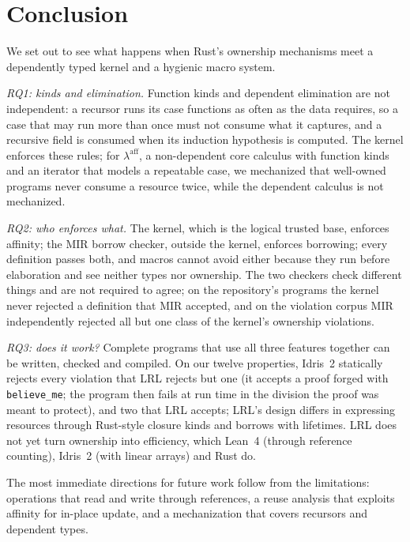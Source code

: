 \section{Conclusion}\label{sec:conclusion}

We set out to see what happens when Rust's ownership mechanisms meet a dependently typed kernel and a hygienic macro system.

\emph{RQ1: kinds and elimination.}
Function kinds and dependent elimination are not independent: a recursor runs its case functions as often as the data requires, so a case that may run more than once must not consume what it captures, and a recursive field is consumed when its induction hypothesis is computed.
The kernel enforces these rules; for $\lambda^{\mathrm{aff}}$, a non-dependent core calculus with function kinds and an iterator that models a repeatable case, we mechanized that well-owned programs never consume a resource twice, while the dependent calculus is not mechanized.

\emph{RQ2: who enforces what.}
The kernel, which is the logical trusted base, enforces affinity; the MIR borrow checker, outside the kernel, enforces borrowing; every definition passes both, and macros cannot avoid either because they run before elaboration and see neither types nor ownership.
The two checkers check different things and are not required to agree; on the repository's programs the kernel never rejected a definition that MIR accepted, and on the violation corpus MIR independently rejected all but one class of the kernel's ownership violations.

\emph{RQ3: does it work?}
Complete programs that use all three features together can be written, checked and compiled.
On our twelve properties, Idris~2 statically rejects every violation that LRL rejects but one (it accepts a proof forged with \lstinline|believe_me|; the program then fails at run time in the division the proof was meant to protect), and two that LRL accepts; LRL's design differs in expressing resources through Rust-style closure kinds and borrows with lifetimes.
LRL does not yet turn ownership into efficiency, which Lean~4 (through reference counting), Idris~2 (with linear arrays) and Rust do.

The most immediate directions for future work follow from the limitations: operations that read and write through references, a reuse analysis that exploits affinity for in-place update, and a mechanization that covers recursors and dependent types.

